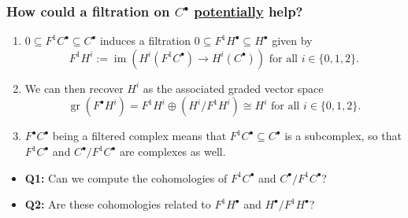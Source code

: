 \documentclass[notheorems, hyperref={backref}]{beamer}
\theoremstyle{darkgreentheorem}
\theoremstyle{darkbluedefinition}
\theoremstyle{darkredexample}
\theoremstyle{remark}
\DeclareMathOperator{\gr}{gr}
\DeclareMathOperator{\im}{im}
\newcommand{\op}{\oplus}
\begin{document}
\begin{frame}
    \frametitle{How could a filtration on $C^{\bullet}$ \underline{potentially} help?}
    \pause
    \begin{enumerate}
	\item $0\subseteq F^{1}C^{\bullet}\subseteq C^{\bullet}$ induces a filtration $0\subseteq F^{1}H^{\bullet}\subseteq H^{\bullet}$ given by
	    \[ F^{1}H^{i}:=\im\left(H^{i}(F^{1}C^{\bullet})\to H^{i}(C^{\bullet})\right) \text{ for all }i\in \{0,1,2\}. \]
	    \vspace{-5mm}
	    \pause
	\item We can then recover $H^{i}$ as the associated graded vector space
	    \[ \gr(F^{\bullet}H^{i})=F^{1}H^{i}\op \left(H^{i}/F^{1}H^{i}\right)\cong H^{i} \text{ for all }i\in \{0,1,2\}. \]
	    \vspace{-5mm}
	    \pause
	\item $F^{\bullet}C^{\bullet}$ being a filtered complex means that $F^{1}C^{\bullet}\subseteq C^{\bullet}$ is a subcomplex, so that $F^{1}C^{\bullet}$ and $C^{\bullet}/F^{1}C^{\bullet}$ are complexes as well.
    \end{enumerate}
    \pause
    \vspace{5mm}
    \begin{itemize}
	\item \textbf{Q1:} Can we compute the cohomologies of $F^{1}C^{\bullet}$ and $C^{\bullet}/F^{1}C^{\bullet}$?
	    \vspace{2mm}
	    \pause
	\item \textbf{Q2:} Are these cohomologies related to $F^{1}H^{\bullet}$ and $H^{\bullet}/F^{1}H^{\bullet}$?
    \end{itemize}
\end{frame}
\end{document}
